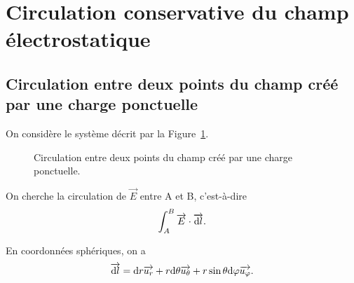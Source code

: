 \section[Circulation du champ électrostatique]{Circulation conservative du champ électrostatique}

    \subsection{Circulation entre deux points du champ créé par une charge ponctuelle}

        On considère le système décrit par la Figure~\ref{fig:circulation_deux_points_champ_cree_charge_ponctuelle}.

        \begin{figure}
            \centering
            \caption{Circulation entre deux points du champ créé par une charge ponctuelle.}    
            \label{fig:circulation_deux_points_champ_cree_charge_ponctuelle}
        \end{figure}
        
        On cherche la circulation de $\vec{E}$ entre A et B, c'est-à-dire 
        \begin{equation}
            \int_{A}^{B}\protect\overrightarrow{{E}}\cdot\protect\overrightarrow{{\mathrm{d} l}}.
        \end{equation}

        En coordonnées sphériques, on a
        \begin{equation}
            \protect\overrightarrow{{\mathrm{d} l}}=\mathrm{d} r\protect\overrightarrow{{u_r}}+r\mathrm{d}\theta\protect\overrightarrow{{u_{\theta}}}+r\sin\theta\mathrm{d}\varphi\protect\overrightarrow{{u_{\varphi}}}.
        \end{equation}

